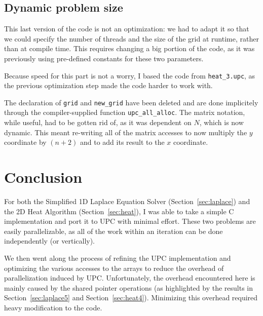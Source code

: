\documentclass[12pt]{article}
\begin{document}


\subsection{Dynamic problem size}

This last version of the code is not an optimization: we had to adapt it so that we could specify the number of threads and the size of the grid at runtime, rather than at compile time.
This requires changing a big portion of the code, as it was previously using pre-defined constants for these two parameters.

Because speed for this part is not a worry, I based the code from \texttt{heat\_3.upc}, as the previous optimization step made the code harder to work with.

The declaration of \texttt{grid} and \texttt{new\_grid} have been deleted and are done implicitely through the compiler-supplied function \texttt{upc\_all\_alloc}.
The matrix notation, while useful, had to be gotten rid of, as it was dependent on $N$, which is now dynamic.
This meant re-writing all of the matrix accesses to now multiply the $y$ coordinate by $(n+2)$ and to add its result to the $x$ coordinate.



\section{Conclusion}

For both the Simplified 1D Laplace Equation Solver (Section~\ref{sec:laplace}) and the 2D Heat Algorithm (Section~\ref{sec:heat}), I was able to take a simple C implementation and port it to UPC with minimal effort.
These two problems are easily parallelizable, as all of the work within an iteration can be done independently (or vertically).

We then went along the process of refining the UPC implementation and optimizing the various accesses to the arrays to reduce the overhead of parallelization induced by UPC.
Unfortunately, the overhead encountered here is mainly caused by the shared pointer operations (as highlighted by the results in Section~\ref{sec:laplace5} and Section~\ref{sec:heat4}).
Minimizing this overhead required heavy modification to the code.
\end{document}
